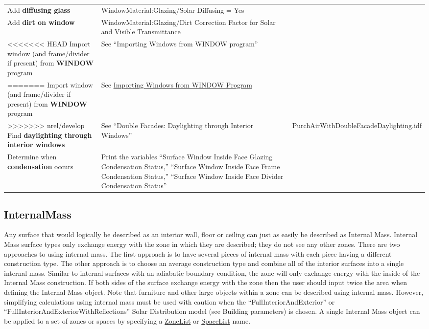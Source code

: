 \begin{longtable}[c]{p{2.0in}p{2.0in}p{2.0in}}
Add \textbf{diffusing glass} & Window\-Material:\-Glazing/\-Solar Diffusing = Yes & \tabularnewline
Add \textbf{dirt on window} & Window\-Material:\-Glazing/\-Dirt Correction Factor for Solar and Visible Transmittance & \tabularnewline
<<<<<<< HEAD
Import window (and frame/divider if present) from \textbf{WINDOW} program & See ``Importing Windows from WINDOW program'' & \tabularnewline
=======
Import window (and frame/divider if present) from \textbf{WINDOW} program & See \hyperref[importing-windows-from-window-program]{Importing Windows from WINDOW Program} & \tabularnewline
>>>>>>> nrel/develop
Find \textbf{daylighting through interior windows} & See ``Double Facades: Daylighting through Interior Windows'' & Purch\-Air\-With\-Double\-Facade\-Daylighting.idf \tabularnewline
Determine when \textbf{condensation} occurs & Print the variables ``Surface Window Inside Face Glazing Condensation Status,'' ``Surface Window Inside Face Frame Condensation Status,'' ``Surface Window Inside Face Divider Condensation Status'' & \tabularnewline
\bottomrule
\end{longtable}

\subsection{InternalMass}\label{internalmass}

Any surface that would logically be described as an interior wall, floor or ceiling can just as easily be described as Internal Mass. Internal Mass surface types only exchange energy with the zone in which they are described; they do not see any other zones. There are two approaches to using internal mass. The first approach is to have several pieces of internal mass with each piece having a different construction type. The other approach is to choose an average construction type and combine all of the interior surfaces into a single internal mass. Similar to internal surfaces with an adiabatic boundary condition, the zone will only exchange energy with the inside of the Internal Mass construction. If both sides of the surface exchange energy with the zone then the user should input twice the area when defining the Internal Mass object. Note that furniture and other large objects within a zone can be described using internal mass. However, simplifying calculations using internal mass must be used with caution when the ``FullInteriorAndExterior'' or ``FullInteriorAndExteriorWithReflections'' Solar Distribution model (see Building parameters) is chosen. A single Internal Mass object can be applied to a set of zones or spaces by specifying a \hyperref[zonelist]{ZoneList} or \hyperref[spacelist]{SpaceList} name.

